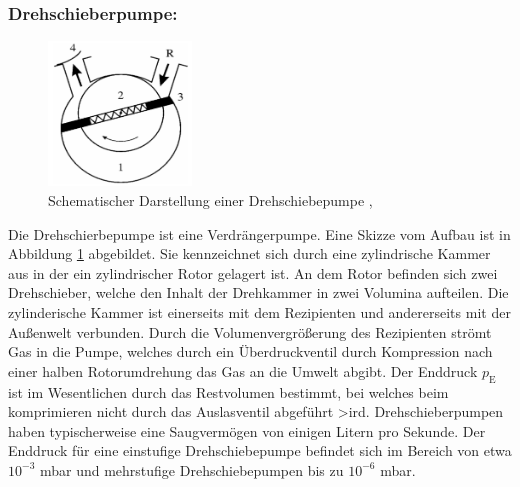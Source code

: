 \subsubsection{Drehschieberpumpe:}
\begin{figure}
    \vspace{-1cm}
    \centering
    \includegraphics[width=0.34\textwidth]{./picture/Drehschieberpumpe.png}
    \caption{Schematischer Darstellung einer Drehschiebepumpe \cite{Dreh},\cite{Jena}}
    \label{fig:Dreh}
    \vspace{-0.5cm}
\end{figure}
Die Drehschierbepumpe ist eine Verdrängerpumpe. Eine Skizze vom Aufbau ist in Abbildung \ref{fig:Dreh} abgebildet. Sie kennzeichnet sich durch eine zylindrische Kammer aus in der ein zylindrischer Rotor gelagert ist. An dem Rotor befinden sich zwei Drehschieber, welche den Inhalt der Drehkammer in zwei Volumina aufteilen. Die zylinderische Kammer ist einerseits mit dem Rezipienten und andererseits mit der Außenwelt verbunden. Durch die Volumenvergrößerung des Rezipienten strömt Gas in die Pumpe, welches durch ein Überdruckventil durch Kompression nach einer halben Rotorumdrehung das Gas an die Umwelt abgibt. Der Enddruck $p_\text{E}$ ist im Wesentlichen durch das Restvolumen bestimmt, bei welches beim komprimieren nicht durch das Auslasventil abgeführt >ird. Drehschieberpumpen haben typischerweise eine Saugvermögen von einigen Litern pro Sekunde. Der Enddruck für eine einstufige Drehschiebepumpe befindet sich im Bereich von etwa $10^{-3}$ mbar und mehrstufige Drehschiebepumpen bis zu $10^{-6}$ mbar.
